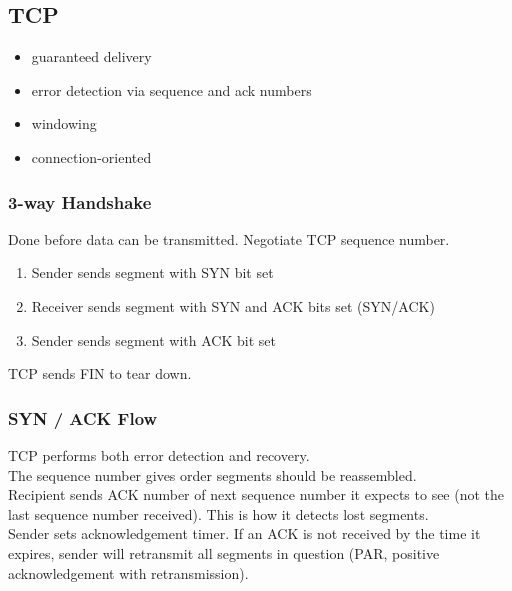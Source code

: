\subsection{TCP}

\begin{itemize}

\item guaranteed delivery
\item error detection via sequence and ack numbers
\item windowing
\item connection-oriented

\end{itemize}

\subsubsection{3-way Handshake}

Done before data can be transmitted. Negotiate TCP sequence number.

\begin{enumerate}

\item Sender sends segment with SYN bit set
\item Receiver sends segment with SYN and ACK bits set (SYN/ACK)
\item Sender sends segment with ACK bit set

\end{enumerate}

TCP sends FIN to tear down.

\subsubsection{SYN / ACK Flow}

TCP performs both error detection and recovery.\\

The sequence number gives order segments should be reassembled.\\

Recipient sends ACK number of next sequence number it expects to see (not the
last sequence number received). This is how it detects lost segments.\\

Sender sets acknowledgement timer. If an ACK is not received by the time
it expires, sender will retransmit all segments in question (PAR,
positive acknowledgement with retransmission).


